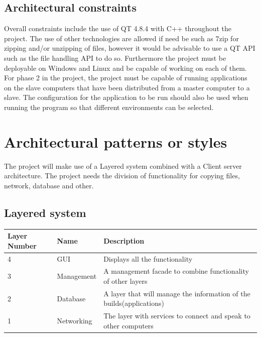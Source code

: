 \documentclass[a4paper,12pt,final]{article}
\begin{document}
\subsection{Architectural constraints}
Overall constraints include the use of QT 4.8.4 with C++ throughout the project. The use of other technologies are allowed if need be such as 7zip for zipping and/or unzipping of files, however it would be advisable to use a QT API such as the file handling API to do so. Furthermore the project must be deployable on Windows and Linux and be capable of working on each of them.
\vspace{6pt}\newline
For phase 2 in the project, the project must be capable of running applications on the slave computers that have been distributed from a master computer to a slave. The configuration for the application to be run should also be used when running the program so that different environments can be selected.

\section{Architectural patterns or styles}
The project will make use of a Layered system combined with a Client server architecture. The project  needs the division of functionality for copying files, network, database and other.
\vspace{6pt}\newline
\subsection{Layered system}
\begin{tabular}{|l|l|p{8cm}|}   
\hline
Layer Number & Name & Description\\
\hline
4 & GUI & Displays all the functionality\\
\hline
3 & Management & A management facade to combine functionality of other layers\\
\hline
2 & Database & A layer that will manage the information of the builds(applications)\\
\hline
1 & Networking & The layer with services to connect and speak to other computers\\
\hline
\end{tabular}

\end{document}
